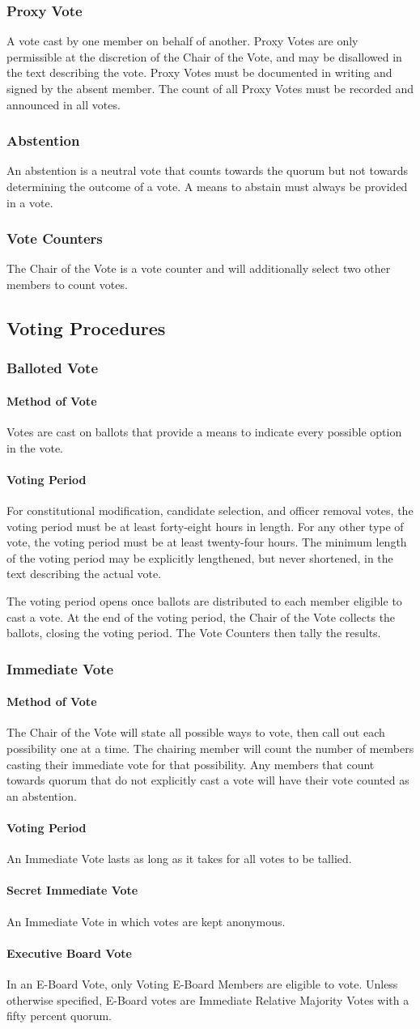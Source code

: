 \documentclass{article}
\newcommand{\asection}[1]{\subsection{#1} \label{#1}}
\newcommand{\asubsection}[1]{\subsubsection{#1} \label{#1}}
\newcommand{\asubsubsection}[1]{\paragraph{#1} \label{#1}}
\begin{document}
\asubsection{Proxy Vote}
A vote cast by one member on behalf of another.
Proxy Votes are only permissible at the discretion of the Chair of the Vote, and may be disallowed in the text describing the vote.
Proxy Votes must be documented in writing and signed by the absent member.
The count of all Proxy Votes must be recorded and announced in all votes.

\asubsection{Abstention}
An abstention is a neutral vote that counts towards the quorum but not towards determining the outcome of a vote.
A means to abstain must always be provided in a vote.

\asubsection{Vote Counters}
The Chair of the Vote is a vote counter and will additionally select two other members to count votes.

\asection{Voting Procedures}

\asubsection{Balloted Vote}

\asubsubsection{Method of Vote}
Votes are cast on ballots that provide a means to indicate every possible option in the vote.

\asubsubsection{Voting Period}
For constitutional modification, candidate selection, and officer removal votes, the voting period must be at least forty-eight hours in length.
For any other type of vote, the voting period must be at least twenty-four hours.
The minimum length of the voting period may be explicitly lengthened, but never shortened, in the text describing the actual vote.

The voting period opens once ballots are distributed to each member eligible to cast a vote.
At the end of the voting period, the Chair of the Vote collects the ballots, closing the voting period.
The Vote Counters then tally the results.

\asubsection{Immediate Vote}

\asubsubsection{Method of Vote}
The Chair of the Vote will state all possible ways to vote, then call out each possibility one at a time.
The chairing member will count the number of members casting their immediate vote for that possibility.
Any members that count towards quorum that do not explicitly cast a vote will have their vote counted as an abstention.

\asubsubsection{Voting Period}
An Immediate Vote lasts as long as it takes for all votes to be tallied.

\asubsubsection{Secret Immediate Vote}
An Immediate Vote in which votes are kept anonymous.

\asubsubsection{Executive Board Vote}
In an E-Board Vote, only Voting E-Board Members are eligible to vote.
Unless otherwise specified, E-Board votes are Immediate Relative Majority Votes with a fifty percent quorum.
\end{document}
